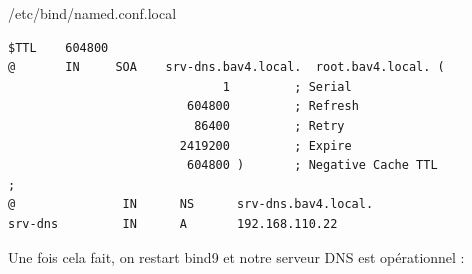 \documentclass{article}
\begin{document}
\begin{configbox}{/etc/bind/named.conf.local}
\begin{lstlisting}
$TTL    604800
@       IN     SOA    srv-dns.bav4.local.  root.bav4.local. (
                              1         ; Serial
                         604800         ; Refresh
                          86400         ; Retry
                        2419200         ; Expire
                         604800 )       ; Negative Cache TTL
;
@               IN      NS      srv-dns.bav4.local.
srv-dns         IN      A       192.168.110.22
\end{lstlisting}
\end{configbox}
Une fois cela fait, on restart bind9 et notre serveur DNS est opérationnel :
\end{document}

